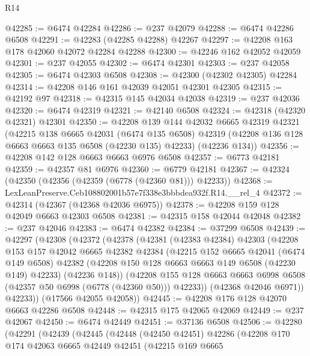 \begin{lexlean}{R14}
\begin{coremodule}
@42285 := @6474 @42284
@42286 := @237 @42079
@42288 := @6474 @42286 @6508
@42291 := @42283 (@42285 @42288) @42267
@42297 := @42208 @163 @178 @42060 @42072 @42284 @42288
@42300 := @42246 @162 @42052 @42059
@42301 := @237 @42055
@42302 := @6474 @42301
@42303 := @237 @42058
@42305 := @6474 @42303 @6508
@42308 := @42300 (@42302 @42305) @42284
@42314 := @42208 @146 @161 @42039 @42051 @42301 @42305
@42315 := @42192 @97
@42318 := @42315 @145 @42034 @42038
@42319 := @237 @42036
@42320 := @6474 @42319
@42321 := @42140 @6508
@42324 := @42318 (@42320 @42321) @42301
@42350 := @42208
    @139
    @144
    @42032
    @6665
    @42319
    @42321
    (@42215
      @138
      @6665
      @42031
      (@6474 @135 @6508)
      @42319
      (@42208 @136 @128 @6663 @6663 @135 @6508 (@42230 @135) @42233)
      (@42236 @134))
@42356 := @42208 @142 @128 @6663 @6663 @6976 @6508
@42357 := @6773 @42181
@42359 := @42357 @81 @6976
@42360 := @6779 @42181
@42367 := @42324 (@42350 (@42356 (@42359 (@6778 (@42360 @81))) @42233))
@42368 := LexLeanPreserve.Ceb108802001b57e7f338e3bbbdea932f.R14.__rel_4
@42372 := @42314 (@42367 (@42368 @42036 @6975))
@42378 := @42208 @159 @128 @42049 @6663 @42303 @6508
@42381 := @42315 @158 @42044 @42048
@42382 := @237 @42046
@42383 := @6474 @42382
@42384 := @37299 @6508
@42439 := @42297
    (@42308
      (@42372
        (@42378
          (@42381
            (@42383 @42384)
            @42303
            (@42208
              @153
              @157
              @42042
              @6665
              @42382
              @42384
              (@42215
                @152
                @6665
                @42041
                (@6474 @149 @6508)
                @42382
                (@42208 @150 @128 @6663 @6663 @149 @6508 (@42230 @149) @42233)
                (@42236 @148))
              (@42208
                @155
                @128
                @6663
                @6663
                @6998
                @6508
                (@42357 @50 @6998 (@6778 (@42360 @50)))
                @42233))
            (@42368 @42046 @6971))
          @42233))
      (@17566 @42055 @42058))
@42445 := @42208 @176 @128 @42070 @6663 @42286 @6508
@42448 := @42315 @175 @42065 @42069
@42449 := @237 @42067
@42450 := @6474 @42449
@42451 := @37136 @6508
@42506 := @42280
    (@42291
      (@42439
        (@42445
          (@42448
            (@42450 @42451)
            @42286
            (@42208
              @170
              @174
              @42063
              @6665
              @42449
              @42451
              (@42215
                @169
                @6665

\end{coremodule}
\end{lexlean}
